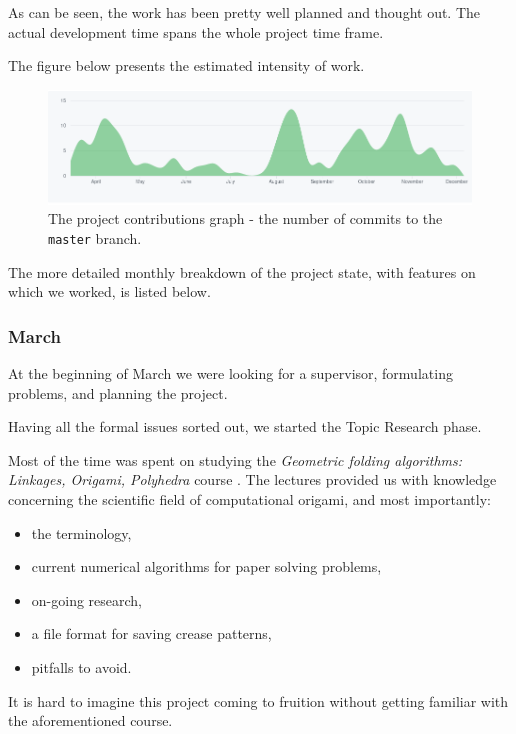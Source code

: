 As can be seen, the work has been pretty well planned and thought out. The actual development time spans the whole project time frame.

The figure below presents the estimated intensity of work.

\begin{figure}[H]
	\label{04-commit-intensity}
	\caption{The project contributions graph - the number of commits to the \texttt{master} branch.}
  \centering
    \includegraphics[width=1.01\textwidth]{assets/4-contributions-graph.png}
\end{figure}

The more detailed monthly breakdown of the project state, with features on which we worked, is listed below.

\subsubsection{March}

At the beginning of March we were looking for a supervisor, formulating problems, and planning the project.

\medskip

Having all the formal issues sorted out, we started the Topic Research phase.

Most of the time was spent on studying the \textit{Geometric folding algorithms: Linkages, Origami, Polyhedra} course \cite{mit-course}.
The lectures provided us with knowledge concerning the scientific field of computational origami, and most importantly:
\begin{itemize}
	\item the terminology,
	\item current numerical algorithms for paper solving problems,
	\item on-going research,
	\item a file format for saving crease patterns,
	\item pitfalls to avoid.
\end{itemize}

It is hard to imagine this project coming to fruition without getting familiar with the aforementioned course.

